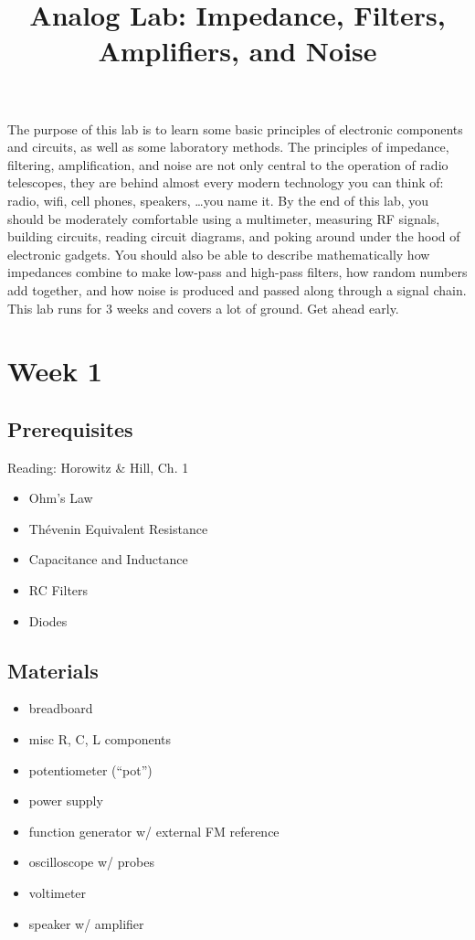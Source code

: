 \documentclass[11pt]{article}
\begin{document}
\title{Analog Lab: Impedance, Filters, Amplifiers, and Noise}

\maketitle

The purpose of this lab is to learn some basic principles of electronic components
and circuits, as well as some laboratory methods.  The principles of impedance,
filtering, amplification, and noise are not only central to the operation of
radio telescopes, they are behind almost every modern technology you can think of:
radio, wifi, cell phones, speakers, \dots  you name it.  By the end of this lab,
you should be moderately comfortable using a multimeter, measuring RF signals,
building circuits, reading circuit diagrams, and poking around under the hood
of electronic gadgets.  You should also be able to describe mathematically how
impedances combine to make low-pass and high-pass filters, how random numbers
add together, and how noise is produced and passed along through a signal chain.
This lab runs for 3 weeks and covers a lot of ground.  Get ahead early.

\section{Week 1}
\label{sec:week1}
\subsection*{Prerequisites}

Reading: Horowitz \& Hill, Ch. 1

\begin{itemize}[noitemsep,nolistsep]
\item Ohm's Law
\item Th\'evenin Equivalent Resistance
\item Capacitance and Inductance
\item RC Filters
\item Diodes
\end{itemize}

\subsection*{Materials}

\begin{itemize}[noitemsep,nolistsep]
\item breadboard
\item misc R, C, L components
\item potentiometer (``pot'')
\item power supply
\item function generator w/ external FM reference
\item oscilloscope w/ probes
\item voltimeter
\item speaker w/ amplifier
\end{itemize}
\end{document}
